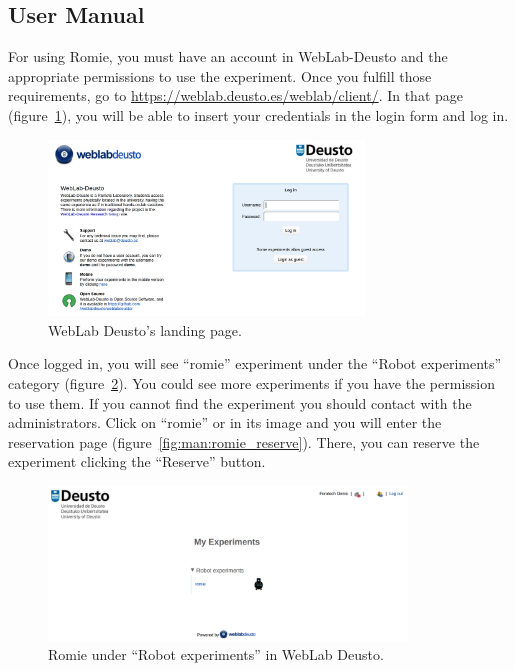 \subsection{User Manual}

For using Romie, you must have an account in WebLab-Deusto and the appropriate permissions to use
the experiment. Once you fulfill those requirements, go to
\url{https://weblab.deusto.es/weblab/client/}. In that page (figure~\ref{fig:man:weblab}), you will
be able to insert your credentials in the login form and log in.

\begin{figure}[ht]
	\centering
	\includegraphics[width=0.75\textwidth]{fig/manuals/weblab}
	\caption{WebLab Deusto's landing page.}
	\label{fig:man:weblab}
\end{figure}

Once logged in, you will see ``romie'' experiment under the ``Robot experiments'' category
(figure~\ref{fig:man:romie_weblab}). You could see more experiments if you have the permission to
use them. If you cannot find the experiment you should contact with the administrators. Click on
``romie'' or in its image and you will enter the reservation page
(figure~\ref{fig:man:romie_reserve}). There, you can reserve the experiment clicking the ``Reserve''
button.

\begin{figure}[!htbp]
	\centering
	\includegraphics[width=0.85\textwidth]{fig/manuals/trivia/romie-weblab}
	\caption{Romie under ``Robot experiments'' in WebLab Deusto.}
	\label{fig:man:romie_weblab}
\end{figure}

